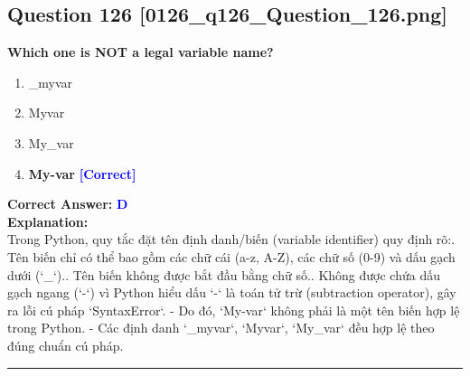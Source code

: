 \documentclass[11pt,a4paper]{article}
\begin{document}
\begin{minipage}{\textwidth}
\subsection*{Question 126 \quad \footnotesize{[0126_q126_Question_126.png]}}
\noindent \textbf{Which one is NOT a legal variable name?}

\begin{enumerate}[label=\Alph*.]
    \item _myvar
    \item Myvar
    \item My_var
    \item \textbf{My-var} \hfill \textcolor{blue}{\textbf{[Correct]}}
\end{enumerate}

\noindent \textbf{Correct Answer:} \textcolor{blue}{\textbf{D}} \\[4pt]
\noindent \textbf{Explanation:}\\
Trong Python, quy tắc đặt tên định danh/biến (variable identifier) quy định rõ:. Tên biến chỉ có thể bao gồm các chữ cái (a-z, A-Z), các chữ số (0-9) và dấu gạch dưới (`_`).. Tên biến không được bắt đầu bằng chữ số.. Không được chứa dấu gạch ngang (`-`) vì Python hiểu dấu `-` là toán tử trừ (subtraction operator), gây ra lỗi cú pháp `SyntaxError`.\newline
- Do đó, `My-var` không phải là một tên biến hợp lệ trong Python.\newline
- Các định danh `_myvar`, `Myvar`, `My_var` đều hợp lệ theo đúng chuẩn cú pháp.
\end{minipage}
\vspace{0.8cm}
\hrule
\vspace{0.5cm}
\end{document}
